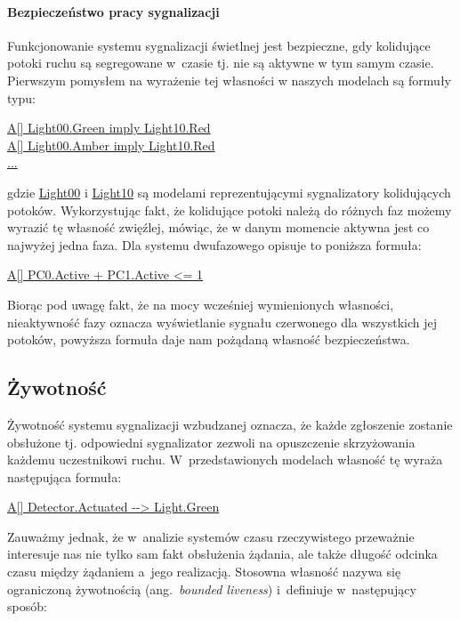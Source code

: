 \documentclass{pracamgr}
\newcommand{\ang}[1]{(ang.~\emph{#1})}
\newcommand{\ttt}[1]{\url{#1}}
\newcommand{\tttform}[1]{
  \begin{center}
    \ttt{#1}
  \end{center}
}
\theoremstyle{plain}
\begin{document}
\paragraph{Bezpieczeństwo pracy sygnalizacji}
Funkcjonowanie systemu sygnalizacji świetlnej jest bezpieczne, gdy
kolidujące potoki ruchu są segregowane w~czasie tj. nie są aktywne w
tym samym czasie. Pierwszym pomysłem na wyrażenie tej własności w
naszych modelach są formuły typu:
\begin{center}
\ttt{A[] Light00.Green imply Light10.Red}\\
\ttt{A[] Light00.Amber imply Light10.Red}\\
\ttt{...}
\end{center}
gdzie \ttt{Light00} i \ttt{Light10} są modelami reprezentującymi
sygnalizatory kolidujących potoków. Wykorzystując fakt, że kolidujące
potoki należą do różnych faz możemy wyrazić tę własność zwięźlej,
mówiąc, że w danym momencie aktywna jest co najwyżej jedna faza. Dla
systemu dwufazowego opisuje to poniższa formuła:
\begin{center}
  \url{A[] PC0.Active + PC1.Active <= 1}
\end{center}
Biorąc pod uwagę fakt, że na mocy wcześniej wymienionych własności,
nieaktywność fazy oznacza wyświetlanie sygnału czerwonego dla
wszystkich jej potoków, powyższa formuła daje nam pożądaną własność
bezpieczeństwa.


\subsection{Żywotność}
\label{s:properties:liveness}

Żywotność systemu sygnalizacji wzbudzanej oznacza, że każde zgłoszenie
zostanie obsłużone tj. odpowiedni sygnalizator zezwoli na opuszczenie
skrzyżowania każdemu uczestnikowi ruchu. W~przedstawionych modelach
własność tę wyraża następująca formuła:
\tttform{A[] Detector.Actuated --> Light.Green}
Zauważmy jednak, że w~analizie systemów czasu rzeczywistego przeważnie
interesuje nas nie tylko sam fakt obsłużenia żądania, ale także
długość odcinka czasu między żądaniem a~jego realizacją. Stosowna
własność nazywa się ograniczoną żywotnością \ang{bounded liveness}
i~definiuje w~następujący sposób:
\end{document}
